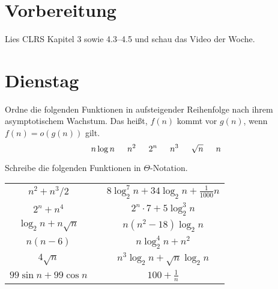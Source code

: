 \documentclass{uebung_cs}
\begin{document}
\section*{Vorbereitung}
Lies CLRS Kapitel 3 sowie 4.3--4.5 und schau das Video der Woche.

\section*{Dienstag}
\begin{aufgabe}\label{tue-first}\mbox{}
	Ordne die folgenden Funktionen in aufsteigender Reihenfolge nach ihrem asymptotischem Wachstum.
	Das heißt, $f(n)$ kommt vor $g(n)$, wenn $f(n) = o(g(n))$ gilt.
	\[n \log n\hspace*{15pt} n^2\hspace*{15pt} 2^n\hspace*{15pt} n^3\hspace*{15pt} \sqrt{n}\hspace*{15pt} n\]
	
\end{aufgabe}

\begin{aufgabe}
	Schreibe die folgenden Funktionen in $\Theta$-Notation.
	\begin{center}
		\begin{tabular}{ccc}
			$n^2 + n^3/2$
			&&
			$8\log_2^7 n + 34\log_2 n + \frac{1}{1000}n$\\
			$2^n + n^4$&&
			$2^n\cdot 7 + 5\log_2^3 n$\\
			$\log_2n + n\sqrt{n}$&&
			$n(n^2 - 18)\log_2 n$\\
			$n(n-6)$&&
			$n\log_2^4 n + n^2$\\
			$4\sqrt{n}$&&
			$n^3 \log_2 n + \sqrt{n}\log_2 n$\\
			$99\sin n + 99\cos n$&& $100+\frac{1}{n}$
		\end{tabular}
	\end{center}
	
\end{aufgabe}
\end{document}
